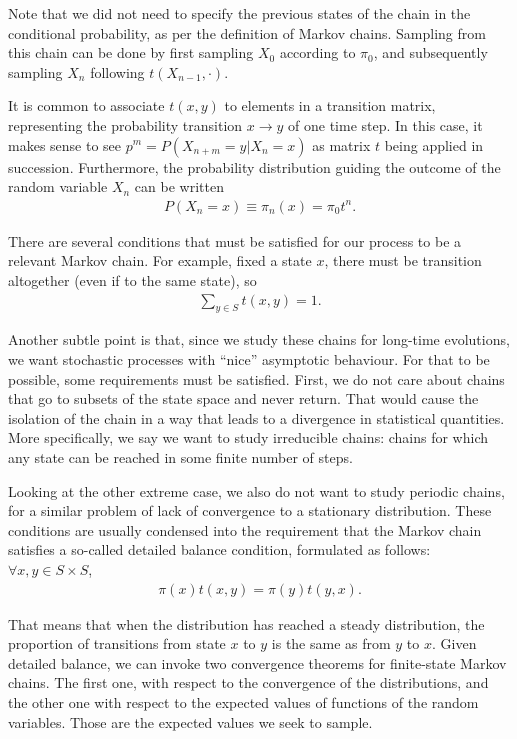 Note that we did not need to specify the previous states of the chain in the conditional probability, as per the definition of Markov chains. Sampling from this chain can be done by first sampling $X_0$ according to $\pi_0$, and subsequently sampling $X_n$ following $t(X_{n-1}, \cdot)$. 

It is common to associate $t(x,y)$ to elements in a transition matrix, representing the probability transition $x \to y$  of one time step. In this case, it makes sense to see $p^m = P(X_{n+m} = y | X_n = x)$ as matrix $t$ being applied in succession. Furthermore, the probability distribution guiding the outcome of the random variable $X_n$ can be written
\begin{align*}
    P(X_n = x) \equiv \pi_n(x) = \pi_0 t^n.
\end{align*}

There are several conditions that must be satisfied for our process to be a relevant Markov chain. For example, fixed a state $x$, there must be transition altogether (even if to the same state), so
\begin{align*}
    \sum_{y \in S} t(x, y) = 1.
\end{align*}

Another subtle point is that, since we study these chains for long-time evolutions, we want stochastic processes with ``nice'' asymptotic behaviour. For that to be possible, some requirements must be satisfied. First, we do not care about chains that go to subsets of the state space and never return. That would cause the isolation of the chain in a way that leads to a divergence in statistical quantities. More specifically, we say we want to study irreducible chains: chains for which any state can be reached in some finite number of steps. 

Looking at the other extreme case, we also do not want to study periodic chains, for a similar problem of lack of convergence to a stationary distribution. These conditions are usually condensed into the requirement that the Markov chain satisfies a so-called detailed balance condition, formulated as follows: $\forall x, y \in S \times S$, 
\begin{align}
    \pi(x)t(x, y) = \pi(y)t(y, x).
    \label{eq:detailed_balance}
\end{align}

That means that when the distribution has reached a steady distribution, the proportion of transitions from state $x$ to $y$ is the same as from $y$ to $x$. Given detailed balance, we can invoke two convergence theorems for finite-state Markov chains. The first one, with respect to the convergence of the distributions, and the other one with respect to the expected values of functions of the random variables. Those are the expected values we seek to sample.

